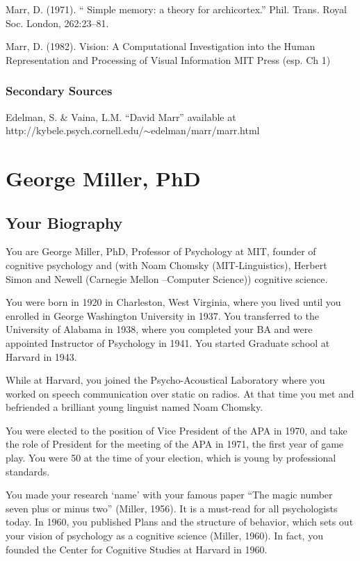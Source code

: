 \begin{refsection}
Marr, D. (1971). `` Simple memory: a theory for archicortex.'' Phil. Trans. Royal Soc. London, 262:23--81.

Marr, D. (1982). Vision: A Computational Investigation into the Human Representation and Processing of Visual Information MIT Press (esp. Ch 1)

\subsection{Secondary Sources}
\label{secondarysources}

Edelman, S. \& Vaina, L.M. ``David Marr'' available at http:\slash \slash kybele.psych.cornell.edu\slash \ensuremath{\sim}edelman\slash marr\slash marr.html

\chapter{George Miller, PhD}
\label{georgemillerphd}

\section{Your Biography}
\label{yourbiography}

You are George Miller, PhD, Professor of Psychology at MIT, founder of cognitive psychology and (with Noam Chomsky (MIT-Linguistics), Herbert Simon and Newell (Carnegie Mellon –Computer Science)) cognitive science.

You were born in 1920 in Charleston, West Virginia, where you lived until you enrolled in George Washington University in 1937. You transferred to the University of Alabama in 1938, where you completed your BA and were appointed Instructor of Psychology in 1941. You started Graduate school at Harvard in 1943.

While at Harvard, you joined the Psycho-Acoustical Laboratory where you worked on speech communication over static on radios. At that time you met and befriended a brilliant young linguist named Noam Chomsky.

You were elected to the position of Vice President of the APA in 1970, and take the role of President for the meeting of the APA in 1971, the first year of game play. You were 50 at the time of your election, which is young by professional standards.

You made your research `name' with your famous paper ``The magic number seven plus or minus two'' (Miller, 1956). It is a must-read for all psychologists today. In 1960, you published Plans and the structure of behavior, which sets out your vision of psychology as a cognitive science (Miller, 1960). In fact, you founded the Center for Cognitive Studies at Harvard in 1960.


\end{refsection}
